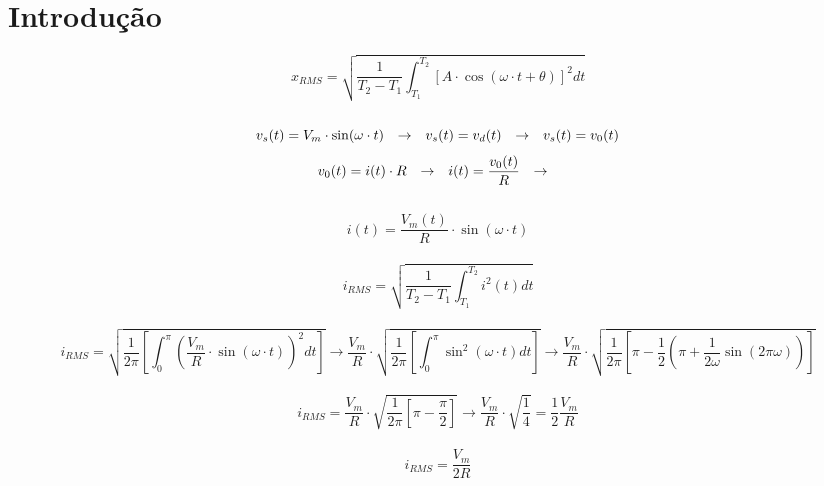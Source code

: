 \documentclass{article}
\begin{document}
    \section{Introdução}
        \[
            x_{RMS} = \sqrt{\frac{1}{T_{2} - T_{1}} \int_{T_{1}}^{T_{2}} [A \cdot \cos(\omega\cdot t + \theta)]^{2} dt}
        \]\\
        \[
            v_{s}(t) = V_{m} \cdot \sin(\omega \cdot t) \hspace{2.5mm} \to \hspace{2.5mm}
            v_{s}(t) = v_{d}(t) \hspace{2.5mm} \to \hspace{2.5mm}
            v_{s}(t) = v_{0}(t)
        \]
        \[
            v_{0}(t) = i(t) \cdot R \hspace{2.5mm} \to \hspace{2.5mm}
            i(t) = \frac{v_{0}(t)}{R} \hspace{2.5mm} \to \hspace{2.5mm}
        \]\\
        \[
            \boxed{i(t) = \frac{V_{m}(t)}{R} \cdot \sin(\omega \cdot t)}
        \]\\
        \[
            i_{RMS} = \sqrt{\frac{1}{T_{2} - T_{1}} \int_{T_{1}}^{T_{2}} i^{2}(t) dt}
        \]\\
        \[
            i_{RMS} = 
                    \sqrt{ \frac{1}{2 \pi}
                        \left[
                            \int_{0}^{\pi} {
                                \left(
                                    \frac{V_{m}}{R} \cdot \sin(\omega \cdot t)
                                \right)}^{2} dt 
                        \right]
                    }
                    \to
                    \frac{V_{m}}{R} \cdot
                    \sqrt{ \frac{1}{2 \pi}
                        \left[
                            \int_{0}^{ \pi} {
                                \sin^{2}(\omega \cdot t)
                            } dt
                        \right]
                    }
                    \to
                    \frac{V_{m}}{R} \cdot
                    \sqrt{ \frac{1}{2 \pi}
                        \left[
                            \pi - \frac{1}{2}\left(\pi + \frac{1}{2 \omega} \sin(2 \pi \omega)\right)
                        \right]
                    }
        \]\\
        \[
            i_{RMS} = 
                    \frac{V_{m}}{R} \cdot
                    \sqrt{ \frac{1}{2 \pi}
                        \left[
                            \pi - \frac{\pi}{2}
                        \right]
                    }
                    \to 
                    \frac{V_{m}}{R} \cdot
                    \sqrt{
                        \frac{1}{4}
                    }
                    = 
                    \frac{1}{2}
                    \frac{V_{m}}{R}
        \]\\
        \[
            \boxed{i_{RMS} = \frac{V_{m}}{2R}}
        \]
\end{document}
